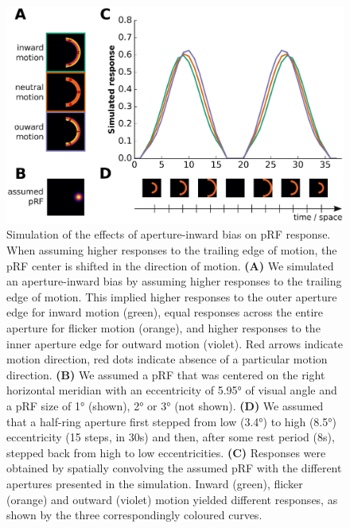 \begin{figure}[htb!]
\centering
\includegraphics[width=\textwidth]{figures/chapter_04/fig5.eps}
\caption{Simulation of the effects of aperture-inward bias on pRF response. When assuming higher responses to the trailing edge of motion, the pRF center is shifted in the direction of motion.
\textbf{(A)} We simulated an aperture-inward bias by assuming higher responses to the trailing edge of motion. This implied higher responses to the outer aperture edge for inward motion (green), equal responses across the entire aperture for flicker motion (orange), and higher responses to the inner aperture edge for outward motion (violet). Red arrows indicate motion direction, red dots indicate absence of a particular motion direction.
\textbf{(B)} We assumed a pRF that was centered on the right horizontal meridian with an eccentricity of 5.95° of visual angle and a pRF size of 1° (shown), 2° or 3° (not shown).
\textbf{(D)} We assumed that a half-ring aperture first stepped from low (3.4°) to high (8.5°) eccentricity (15 steps, in 30s) and then, after some rest period (8s), stepped back from high to low eccentricities. 
\textbf{(C)} Responses were obtained by spatially convolving the assumed pRF with the different apertures presented in the simulation. Inward (green), flicker (orange) and outward (violet) motion yielded different responses, as shown by the three correspondingly coloured curves.}
\label{fig:trlEdge}
\end{figure}

